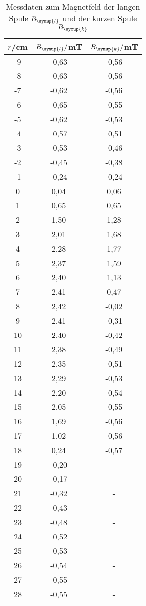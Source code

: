 \begin{table}
  \centering
    \caption{Messdaten zum Magnetfeld der langen Spule $B_{\symup{l}}$ und der
    kurzen Spule $B_{\symup{k}}$}
    \label{tab:einzelne_spulen}
    \begin{tabular}{c c c}
      \toprule
      $r$/cm & $B_{\symup{l}}/$mT & $B_{\symup{k}}/$mT\\
      \midrule
      -9	&  -0,63 &	  -0,56\\
      -8	&  -0,63 &	  -0,56\\
      -7	&  -0,62 &	  -0,56\\
      -6	&  -0,65 &	  -0,55\\
      -5	&  -0,62 &	  -0,53\\
      -4	&  -0,57 &	  -0,51\\
      -3	&  -0,53 &  -0,46\\
      -2	&  -0,45 &  -0,38\\
      -1	&  -0,24 &   -0,24\\
      0	  &  0,04 &    0,06\\
      1	  &  0,65 &   0,65\\
      2	  &  1,50 &   1,28\\
      3	  &  2,01 &   1,68\\
      4	  &  2,28 &   1,77\\
      5	  &  2,37 &   1,59\\
      6   &  2,40 &   1,13\\
      7	  &  2,41 &   0,47\\
      8	  &  2,42 &  -0,02\\
      9	  &  2,41 &  -0,31\\
      10	&  2,40  &  -0,42\\
      11	&  2,38  &  -0,49\\
      12	&  2,35  &  -0,51\\
      13	&  2,29  &  -0,53\\
      14	&  2,20  &  -0,54\\
      15	&  2,05  &  -0,55\\
      16	&  1,69  &  -0,56\\
      17	&  1,02  &  -0,56\\
      18  &  0,24  &  -0,57\\
      19	&  -0,20 & -\\
      20	&  -0,17 & -\\
      21	&  -0,32 & -\\
      22	&  -0,43 & -\\
      23	&  -0,48 & -\\
      24	&  -0,52 & -\\
      25	&  -0,53 & -\\
      26	&  -0,54 & -\\
      27	&  -0,55 & -\\
      28	&  -0,55 & -\\
      \bottomrule
    \end{tabular}
\end{table}

